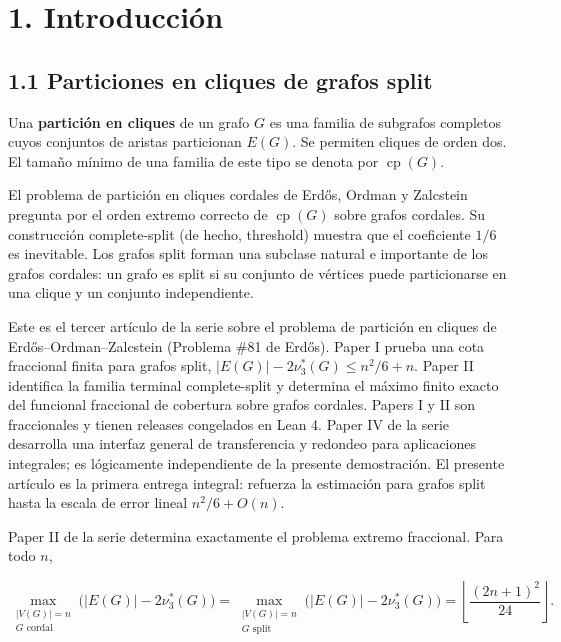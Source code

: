 \documentclass[
  11pt,
]{article}
\begin{document}
\section{1. Introducción}\label{introducciuxf3n}

\subsection{1.1 Particiones en cliques de grafos split}\label{particiones-en-cliques-de-grafos-split}

Una \textbf{partición en cliques} de un grafo \(G\) es una familia de subgrafos completos cuyos conjuntos de aristas particionan \(E(G)\). Se permiten cliques de orden dos. El tamaño mínimo de una familia de este tipo se denota por \(\operatorname{cp}(G)\).

El problema de partición en cliques cordales de Erdős, Ordman y Zalcstein pregunta por el orden extremo correcto de \(\operatorname{cp}(G)\) sobre grafos cordales. Su construcción complete-split (de hecho, threshold) muestra que el coeficiente \(1/6\) es inevitable. Los grafos split forman una subclase natural e importante de los grafos cordales: un grafo es split si su conjunto de vértices puede particionarse en una clique y un conjunto independiente.

Este es el tercer artículo de la serie sobre el problema de partición en cliques de Erdős--Ordman--Zalcstein (Problema \#81 de Erdős). Paper I prueba una cota fraccional finita para grafos split, \(|E(G)|-2\nu_3^*(G)\le n^2/6+n\). Paper II identifica la familia terminal complete-split y determina el máximo finito exacto del funcional fraccional de cobertura sobre grafos cordales. Papers I y II son fraccionales y tienen releases congelados en Lean 4. Paper IV de la serie desarrolla una interfaz general de transferencia y redondeo para aplicaciones integrales; es lógicamente independiente de la presente demostración. El presente artículo es la primera entrega integral: refuerza la estimación para grafos split hasta la escala de error lineal \(n^2/6+O(n)\).

Paper II de la serie determina exactamente el problema extremo fraccional. Para todo \(n\),

\[
\max_{\substack{|V(G)|=n\\G\text{ cordal}}}
\bigl(|E(G)|-2\nu_3^*(G)\bigr)
=
\max_{\substack{|V(G)|=n\\G\text{ split}}}
\bigl(|E(G)|-2\nu_3^*(G)\bigr)
=
\left\lfloor\frac{(2n+1)^2}{24}\right\rfloor.
\]
\end{document}
